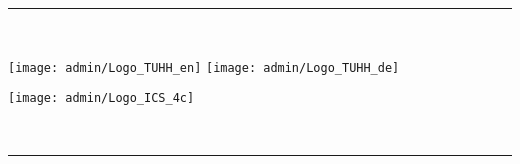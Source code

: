 \thispagestyle{empty}

\begin{titlepage}

\newcommand{\HRule}{\textcolor{darkBlue}{\rule{\textwidth}{0.4mm}}} %
\center %

{
	{
	{}}
}

\HRule \\[0.4cm]
\begin{minipage}{0.5\textwidth}
\begin{flushleft} \large
	{\texttt{[image: admin/Logo\_TUHH\_en]}}
	{\texttt{[image: admin/Logo\_TUHH\_de]}}
\end{flushleft}
\end{minipage}
\hfill
\begin{minipage}{0.4\textwidth}
\begin{flushright} \large
\texttt{[image: admin/Logo\_ICS\_4c]} %
\end{flushright}
\end{minipage}\\[0.4cm]

\HRule \\[3cm]
 {\large \textsc{\thesisname}}\\[1cm]
{\fontsize{32}{32}\selectfont
{}\par
}

\vfill


\begin{minipage}[b]{0.6\textwidth}
\begin{flushleft} \large
{}\\
\authorfirstname\, \authorfamilyname \\[1cm] %


\end{flushleft}
\end{minipage}
\end{titlepage}
